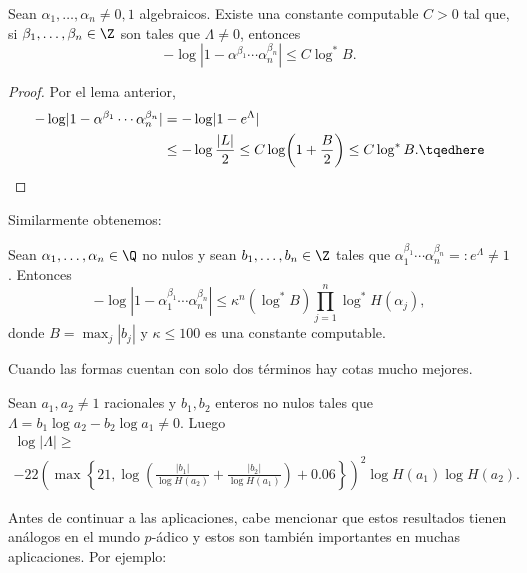 \documentclass[11pt, reqno]{amsart}
\begin{document}
\begin{thm}
	Sean $\alpha_1,\ldots,\alpha_n\neq 0,1$ algebraicos. Existe una constante computable $C>0$ tal que, si $\beta_1,\ldots,\beta_n\in \Z$ son tales que $\Lambda\neq 0$, entonces $$-\log|1-\alpha^{\beta_1}\cdots\alpha_n^{\beta_n}|\leq C\log^*B.$$
\end{thm}
\begin{proof}
	Por el lema anterior,
	\begin{align*}
		-\log\lvert 1 - \alpha^{\beta_1}\cdots\alpha_n^{\beta_n} \rvert &= -\log\lvert 1 - e^{\Lambda} \rvert \\
										&\leq -\log \frac{|L|}{2}\leq C\log\mathopen{}\left( 1+\frac{B}{2} \right)\mathclose{}
										\leq C\log^*B.
										\tqedhere
	\end{align*}
\end{proof}

Similarmente obtenemos:
\begin{thm}
	Sean $\alpha_1,\ldots,\alpha_n\in \Q$ no nulos y sean $b_1,\ldots,b_n\in \Z$ tales que $\alpha_1^{\beta_1}\cdots\alpha_n^{\beta_n}=:e^\Lambda\neq 1$.
	Entonces
	\[
		-\log|1-\alpha_1^{\beta_1}\cdots\alpha_n^{\beta_n}|\leq \kappa^n(\log^*B) \prod_{j=1}^n\log^*H(\alpha_j),
	\]
	donde $B=\max_j|b_j|$ y $\kappa \le 100$ es una constante computable.  
\end{thm}

Cuando las formas cuentan con solo dos términos hay cotas mucho mejores.
\begin{thm}
	\label{LMF}
	Sean $a_1,a_2\neq 1$ racionales y $b_1,b_2$ enteros no nulos tales que $\Lambda=b_1\log a_2-b_2\log a_1\neq 0$.
	Luego
	\begin{multline*}
		\log\lvert\Lambda\rvert \geq \\
		-22\left( \max\left\{ 21, \log\mathopen{}\left( \frac{|b_1|}{\log H(a_2)}+\frac{|b_2|}{\log H(a_1)} \right)\mathclose{} + 0.06\right\} \right)^2
		\log H(a_1)\log H(a_2).
	\end{multline*}
\end{thm}

Antes de continuar a las aplicaciones, cabe mencionar que estos resultados
tienen análogos en el mundo $p$-ádico y estos son también importantes en muchas
aplicaciones. Por ejemplo:
\end{document}
